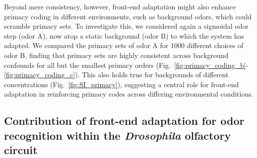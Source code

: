 \documentclass[10pt,prl,aps,showpacs,twocolumn,unsortedaddress,showkeys,linenumbers]{revtex4-1}
\begin{document}
Beyond mere consistency, however, front-end adaptation might also enhance primacy coding in different environments, such as background odors, which could scramble primacy sets. To investigate this, we considered again a sigmoidal odor step (odor A), now atop a static background (odor B) to which the system has adapted. We compared the primacy sets of odor A for 1000 different choices of odor B, finding that primacy sets are highly consistent across background confounds for all but the smallest primacy orders (Fig.~\ref{fig:primacy_coding_b}-\ref{fig:primacy_coding_c}). This also holds true for backgrounds of different concentrations (Fig.~\ref{fig:SI_primacy}), suggesting a central role for front-end adaptation in reinforcing primacy codes across differing environmental conditions. 


\subsection*{Contribution of front-end adaptation for odor recognition within the \textit{Drosophila} olfactory circuit}
\end{document}
